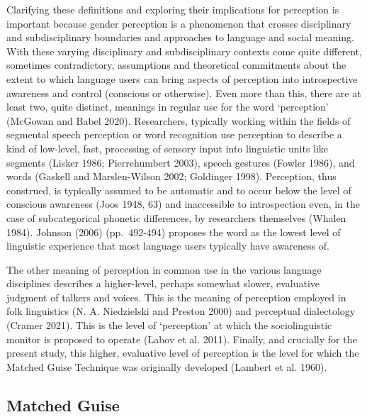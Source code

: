 \documentclass[
  letterpaper,
  DIV=11,
  numbers=noendperiod]{scrartcl}
\begin{document}
Clarifying these definitions and exploring their implications for
perception is important because gender perception is a phenomenon that
crosses disciplinary and subdisciplinary boundaries and approaches to
language and social meaning. With these varying disciplinary and
subdisciplinary contexts come quite different, sometimes contradictory,
assumptions and theoretical commitments about the extent to which
language users can bring aspects of perception into introspective
awareness and control (conscious or otherwise). Even more than this,
there are at least two, quite distinct, meanings in regular use for the
word `perception' (McGowan and Babel 2020). Researchers, typically
working within the fields of segmental speech perception or word
recognition use perception to describe a kind of low-level, fast,
processing of sensory input into linguistic units like segments (Lisker
1986; Pierrehumbert 2003), speech gestures (Fowler 1986), and words
(Gaskell and Marslen-Wilson 2002; Goldinger 1998). Perception, thus
construed, is typically assumed to be automatic and to occur below the
level of conscious awareness (Joos 1948, 63) and inaccessible to
introspection even, in the case of subcategorical phonetic differences,
by researchers themselves (Whalen 1984). Johnson (2006) (pp.~492-494)
proposes the word as the lowest level of linguistic experience that most
language users typically have awareness of.

The other meaning of perception in common use in the various language
disciplines describes a higher-level, perhaps somewhat slower,
evaluative judgment of talkers and voices. This is the meaning of
perception employed in folk linguistics (N. A. Niedzielski and Preston
2000) and perceptual dialectology (Cramer 2021). This is the level of
`perception' at which the sociolinguistic monitor is proposed to operate
(Labov et al. 2011). Finally, and crucially for the present study, this
higher, evaluative level of perception is the level for which the
Matched Guise Technique was originally developed (Lambert et al. 1960).

\subsection{Matched Guise}\label{sub-mgt}
\end{document}
